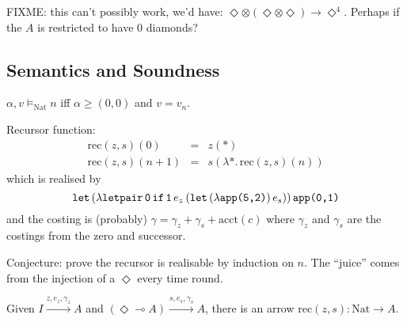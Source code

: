 \documentclass{workingnote}
\newcommand{\account}{\mathrm{acct}}
\newcommand{\TyNat}{\mathrm{Nat}}
\begin{document}
FIXME: this can't possibly work, we'd have:
$\Diamond \otimes (\Diamond \otimes \Diamond) \to \Diamond^4$. Perhaps
if the $A$ is restricted to have $0$ diamonds?

\subsection{Semantics and Soundness}

\begin{definition}
  $\alpha, v \models_\TyNat n$ iff $\alpha \geq (0,0)$ and $v = v_n$.
\end{definition}

Recursor function:
\begin{displaymath}
  \begin{array}{lcl}
    \mathrm{rec}(z,s)(0)   & = & z(*) \\
    \mathrm{rec}(z,s)(n+1) & = & s(\lambda \mathord{*}.\,\mathrm{rec}(z,s)(n))
  \end{array}
\end{displaymath}
which is realised by
\begin{displaymath}
  \texttt{let}\,(\lambda \texttt{letpair}\,\texttt{0}\,\texttt{if}\,\texttt{1}\,e_z\,(\texttt{let}\,(\lambda\texttt{app(}\texttt{5}\texttt{,}\texttt{2}\texttt{)})\,e_s))\,\texttt{app(}\texttt{0}\texttt{,}\texttt{1}\texttt{)}
\end{displaymath}
and the costing is (probably)
$\gamma = \gamma_z + \gamma_s + \account(c)$ where $\gamma_z$ and
$\gamma_s$ are the costings from the zero and successor.

Conjecture: prove the recursor is realisable by induction on $n$. The
``juice'' comes from the injection of a $\Diamond$ every time round.

\begin{lemma}
  Given $I \stackrel{z,e_z,\gamma_z}\longrightarrow A$ and
  $(\Diamond \multimap A) \stackrel{s,e_s,\gamma_s}\longrightarrow A$,
  there is an arrow $\mathrm{rec}(z,s) : \TyNat \to A$.
\end{lemma}
\end{document}
